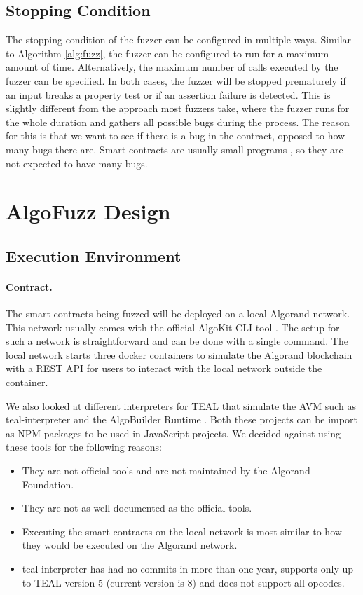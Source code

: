 \subsection*{Stopping Condition}
The stopping condition of the fuzzer can be configured in multiple ways.
Similar to Algorithm \ref{alg:fuzz}, the fuzzer can be configured to run for a maximum amount of time.
Alternatively, the maximum number of calls executed by the fuzzer can be specified.
In both cases, the fuzzer will be stopped prematurely if an input breaks a property test or if an assertion failure is detected.
This is slightly different from the approach most fuzzers take, where the fuzzer runs for the whole duration and gathers all possible bugs during the process.
The reason for this is that we want to see if there is a bug in the contract, opposed to how many bugs there are.
Smart contracts are usually small programs \cite{gao_checking_2021}, so they are not expected to have many bugs.

\section{AlgoFuzz Design}

\subsection*{Execution Environment}
\paragraph*{Contract.} The smart contracts being fuzzed will be deployed on a local Algorand network. This network usually comes with the official AlgoKit CLI tool \cite{noauthor_algokit_nodate}. The setup for such a network is straightforward and can be done with a single command. The local network starts three docker containers to simulate the Algorand blockchain with a \acs{REST} \acs{API} for users to interact with the local network outside the container.

We also looked at different interpreters for \ac{TEAL} that simulate the \ac{AVM} such as teal-interpreter \cite{noauthor_hone-labsteal-interpreter_nodate} and the AlgoBuilder Runtime \cite{noauthor_algo-builderruntime_nodate}.
Both these projects can be import as NPM packages to be used in JavaScript projects.
We decided against using these tools for the following reasons:
\begin{itemize}
    \item They are not official tools and are not maintained by the Algorand Foundation.
    \item They are not as well documented as the official tools.
    \item Executing the smart contracts on the local network is most similar to how they would be executed on the Algorand network.
    \item teal-interpreter has had no commits in more than one year, supports only up to \ac{TEAL} version 5 (current version is 8) and does not support all opcodes.
\end{itemize}


